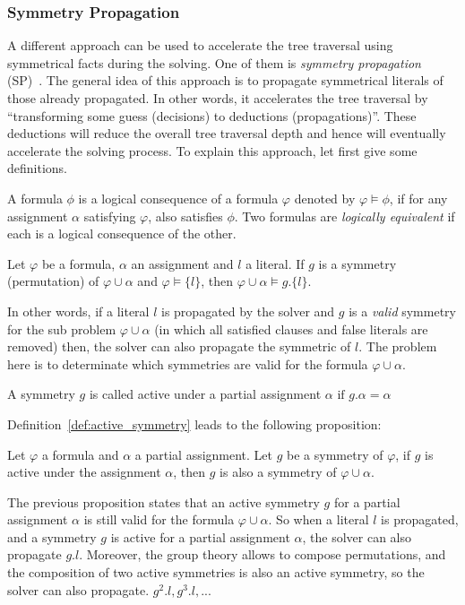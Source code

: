 \subsubsection{Symmetry Propagation}
A different approach can be used to accelerate the tree traversal using symmetrical facts during the solving.
One of them is \emph{symmetry propagation} (SP)~\cite{Devriendt12}.
The general idea of this approach is to propagate symmetrical literals of those already propagated.
In other words, it accelerates the tree traversal by ``transforming some guess (decisions) to deductions (propagations)''.
These deductions will reduce the overall tree traversal depth and hence will eventually accelerate the solving process. To explain this approach, 
let first give some definitions.
\begin{definition}
 \label{def:logical_consequence}
 A formula $\phi$ is a logical consequence of a formula $\varphi$ denoted by $\varphi \models \phi$, if for any assignment
 $\alpha$ satisfying $\varphi$, also satisfies $\phi$. Two formulas are \emph{logically equivalent} if each is a logical
 consequence of the other.
\end{definition}
\begin{proposition}
 \label{prop:symmetry_propagation}
 Let $\varphi$ be a formula, $\alpha$ an assignment and $l$ a literal. 
 If $g$ is a symmetry (permutation) of $\varphi \cup \alpha$ and
 $\varphi \models \{l\}$, then $\varphi \cup \alpha \models g.\{l\}$.
\end{proposition}
In other words, if a literal $l$ is propagated by the solver and $g$ is a \emph{valid} symmetry for the
sub problem $\varphi \cup \alpha$ (in which all satisfied clauses and false literals are removed) then, the solver can
also propagate the symmetric of $l$. The problem here is to determinate which symmetries are valid for the formula
$\varphi \cup \alpha$.
\begin{definition}
 \label{def:active_symmetry}
 A symmetry $g$ is called active under a partial assignment $\alpha$ $\text{if } g.\alpha = \alpha$
\end{definition}
Definition~\ref{def:active_symmetry} leads to the following proposition:
\begin{proposition}
 \label{prop:active_symmetry}
 Let $\varphi$ a formula and $\alpha$ a partial assignment. Let $g$ be a symmetry of $\varphi$,
 if $g$ is active under the assignment $\alpha$, then $g$ is also a symmetry of $\varphi \cup \alpha$.
\end{proposition}
The previous proposition states that an active symmetry $g$ for a partial assignment $\alpha$ is still valid for
the formula $\varphi \cup \alpha$. So when a literal $l$ is propagated, and a symmetry $g$ is active for a
partial assignment $\alpha$, the solver can also propagate $g.l$. 
Moreover, the group theory allows to compose permutations, and the composition of two active symmetries is also an active symmetry,
so the solver can also propagate. $g^2.l, g^3.l, ... $


